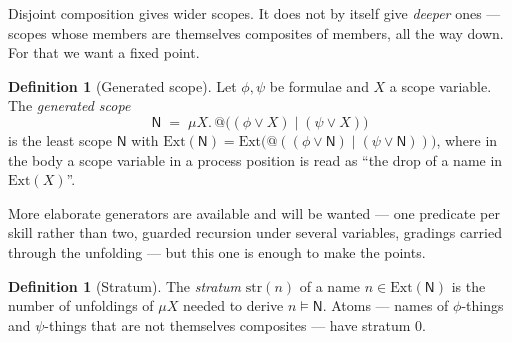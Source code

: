 \documentclass[11pt]{article}
\makeatletter
\theoremstyle{plain}
\theoremstyle{definition}
\newtheorem{definition}[theorem]{Definition}
\theoremstyle{remark}
\newcommand{\Nsp}{\mathsf{N}}
\newcommand{\quo}[1]{@#1}
\newcommand{\Ext}{\mathrm{Ext}}
\newcommand{\str}{\mathrm{str}}
\makeatother
\begin{document}
Disjoint composition gives wider scopes. It does not by itself give
\emph{deeper} ones --- scopes whose members are themselves composites of
members, all the way down. For that we want a fixed point.

\begin{definition}[Generated scope]\label{sco:def:gen}
Let $\phi, \psi$ be formulae and $X$ a scope variable. The
\emph{generated scope}
\[
  \Nsp \;=\; \mu X.\, \quo{\bigl( (\phi \lor X) \mid (\psi \lor X) \bigr)}
\]
is the least scope $\Nsp$ with
$\Ext(\Nsp) = \Ext\bigl(\quo{((\phi \lor \Nsp) \mid (\psi \lor \Nsp))}\bigr)$,
where in the body a scope variable in a process position is read as
``the drop of a name in $\Ext(X)$''.
\end{definition}

More elaborate generators are available and will be wanted --- one
predicate per skill rather than two, guarded recursion under several
variables, gradings carried through the unfolding --- but this one is
enough to make the points.

\begin{definition}[Stratum]\label{sco:def:stratum}
The \emph{stratum} $\str(n)$ of a name $n \in \Ext(\Nsp)$ is the number of
unfoldings of $\mu X$ needed to derive $n \models \Nsp$. Atoms --- names
of $\phi$-things and $\psi$-things that are not themselves composites ---
have stratum $0$.
\end{definition}
\end{document}
